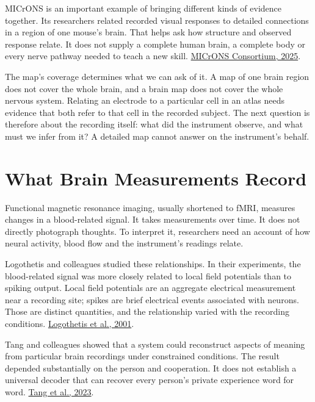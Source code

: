 MICrONS is an important example of bringing different kinds of evidence together. Its researchers related recorded visual responses to detailed connections in a region of one mouse's brain. That helps ask how structure and observed response relate. It does not supply a complete human brain, a complete body or every nerve pathway needed to teach a new skill. \href{https://www.nature.com/articles/s41586-025-08790-w}{MICrONS Consortium, 2025}.\par

The map's coverage determines what we can ask of it. A map of one brain region does not cover the whole brain, and a brain map does not cover the whole nervous system. Relating an electrode to a particular cell in an atlas needs evidence that both refer to that cell in the recorded subject. The next question is therefore about the recording itself: what did the instrument observe, and what must we infer from it? A detailed map cannot answer on the instrument's behalf.\par

\section{What Brain Measurements Record}

Functional magnetic resonance imaging, usually shortened to fMRI, measures changes in a blood-related signal. It takes measurements over time. It does not directly photograph thoughts. To interpret it, researchers need an account of how neural activity, blood flow and the instrument's readings relate.\par

Logothetis and colleagues studied these relationships. In their experiments, the blood-related signal was more closely related to local field potentials than to spiking output. Local field potentials are an aggregate electrical measurement near a recording site; spikes are brief electrical events associated with neurons. Those are distinct quantities, and the relationship varied with the recording conditions. \href{https://pubmed.ncbi.nlm.nih.gov/11449264/}{Logothetis et al., 2001}.\par

Tang and colleagues showed that a system could reconstruct aspects of meaning from particular brain recordings under constrained conditions. The result depended substantially on the person and cooperation. It does not establish a universal decoder that can recover every person's private experience word for word. \href{https://www.nature.com/articles/s41593-023-01304-9}{Tang et al., 2023}.\par

